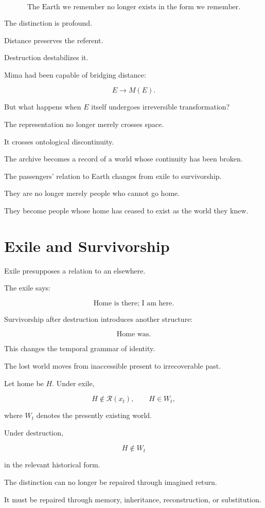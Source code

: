 \documentclass[11pt,oneside]{book}
\theoremstyle{definition}
\theoremstyle{remark}
\newcommand{\R}{\mathcal{R}}
\begin{document}
\[
\text{The Earth we remember no longer exists in the form we remember.}
\]

The distinction is profound.

Distance preserves the referent.

Destruction destabilizes it.

Mima had been capable of bridging distance:

\[
E
\longrightarrow
M(E).
\]

But what happens when \(E\) itself undergoes irreversible transformation?

The representation no longer merely crosses space.

It crosses ontological discontinuity.

The archive becomes a record of a world whose continuity has been broken.

The passengers' relation to Earth changes from exile to survivorship.

They are no longer merely people who cannot go home.

They become people whose home has ceased to exist as the world they knew.

\section{Exile and Survivorship}

Exile presupposes a relation to an elsewhere.

The exile says:

\[
\text{Home is there; I am here.}
\]

Survivorship after destruction introduces another structure:

\[
\text{Home was.}
\]

This changes the temporal grammar of identity.

The lost world moves from inaccessible present to irrecoverable past.

Let home be \(H\). Under exile,

\[
H\notin\R(x_t),
\qquad
H\in W_t,
\]

where \(W_t\) denotes the presently existing world.

Under destruction,

\[
H\notin W_t
\]

in the relevant historical form.

The distinction can no longer be repaired through imagined return.

It must be repaired through memory, inheritance, reconstruction, or substitution.
\end{document}
